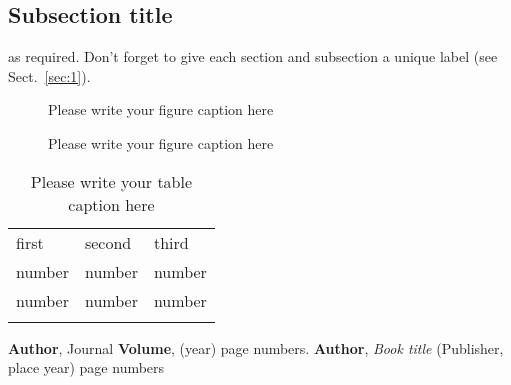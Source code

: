 \subsection{Subsection title}
\label{sec:2}
as required. Don't forget to give each section
and subsection a unique label (see Sect.~\ref{sec:1}).
%
\begin{figure}
\caption{Please write your figure caption here}
\label{fig:1}       %
\end{figure}
%
\begin{figure*}
\vspace*{5cm}       %
\caption{Please write your figure caption here}
\label{fig:2}       %
\end{figure*}
%
\begin{table}
\caption{Please write your table caption here}
\label{tab:1}       %
\begin{tabular}{lll}
\hline\noalign{\smallskip}
first & second & third  \\
\noalign{\smallskip}\hline\noalign{\smallskip}
number & number & number \\
number & number & number \\
\noalign{\smallskip}\hline
\end{tabular}
\vspace*{5cm}  %
\end{table}
%
% 
% 
%
\begin{thebibliography}{}
%
%
\textbf{Author}, Journal \textbf{Volume}, (year) page numbers.
\textbf{Author}, \textit{Book title} (Publisher, place year) page numbers
\end{thebibliography}




